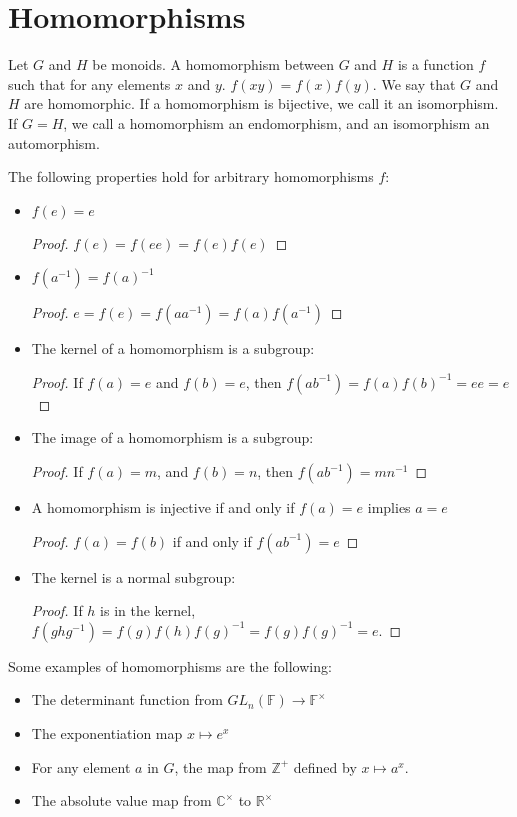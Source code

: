 \documentclass{report}
\begin{document}
\section{Homomorphisms}

Let $G$ and $H$ be monoids. A homomorphism between $G$ and $H$ is a function $f$ such that for any elements $x$ and $y$. $f(xy) = f(x)f(y)$. We say that $G$ and $H$ are homomorphic. If a homomorphism is bijective, we call it an isomorphism. If $G = H$, we call a homomorphism an endomorphism, and an isomorphism an automorphism.

The following properties hold for arbitrary homomorphisms $f$:
\begin{itemize}
    \item $f(e) = e$
    \begin{proof} $f(e) = f(ee) = f(e)f(e)$ \end{proof}
    \item $f(a^{-1}) = f(a)^{-1}$
    \begin{proof} $e = f(e) = f(aa^{-1}) = f(a)f(a^{-1})$ \end{proof}
    \item The kernel of a homomorphism is a subgroup:
    \begin{proof} If $f(a) = e$ and $f(b) = e$, then $f(ab^{-1}) = f(a)f(b)^{-1} = ee = e$ \end{proof}
    \item The image of a homomorphism is a subgroup:
    \begin{proof} If $f(a) = m$, and $f(b) = n$, then $f(ab^{-1}) = mn^{-1}$ \end{proof}
    \item A homomorphism is injective if and only if $f(a) = e$ implies $a = e$
    \begin{proof} $f(a) = f(b)$ if and only if $f(ab^{-1}) = e$ \end{proof}
    \item The kernel is a normal subgroup:
    \begin{proof} If $h$ is in the kernel, $f(ghg^{-1}) = f(g)f(h)f(g)^{-1} = f(g)f(g)^{-1} = e$. \end{proof}
\end{itemize}

Some examples of homomorphisms are the following:
\begin{itemize}
    \item The determinant function from $GL_n(\mathbb{F}) \to \mathbb{F}^\times$
    \item The exponentiation map $x \mapsto e^x$
    \item For any element $a$ in $G$, the map from $\mathbb{Z}^+$ defined by $x \mapsto a^x$.
    \item The absolute value map from $\mathbb{C}^\times$ to $\mathbb{R}^\times$
\end{itemize}
\end{document}
